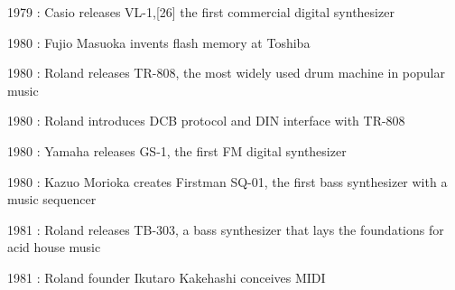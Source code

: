 \documentclass[12pt]{report}
\begin{document}
\begin{adjustwidth}{0.5in}{0.0in}
1979 : Casio releases VL-1,[26] the first commercial digital synthesizer\par

\end{adjustwidth}

\begin{adjustwidth}{0.5in}{0.0in}
1980 : Fujio Masuoka invents flash memory at Toshiba\par

\end{adjustwidth}

\begin{adjustwidth}{0.5in}{0.0in}
1980 : Roland releases TR-808, the most widely used drum machine in popular music\par

\end{adjustwidth}

\begin{adjustwidth}{0.5in}{0.0in}
1980 : Roland introduces DCB protocol and DIN interface with TR-808\par

\end{adjustwidth}

\begin{adjustwidth}{0.5in}{0.0in}
1980 : Yamaha releases GS-1, the first FM digital synthesizer\par

\end{adjustwidth}

\begin{adjustwidth}{0.5in}{0.0in}
1980 : Kazuo Morioka creates Firstman SQ-01, the first bass synthesizer with a music sequencer\par

\end{adjustwidth}

\begin{adjustwidth}{0.5in}{0.0in}
1981 : Roland releases TB-303, a bass synthesizer that lays the foundations for acid house music\par

\end{adjustwidth}

\begin{adjustwidth}{0.5in}{0.0in}
1981 : Roland founder Ikutaro Kakehashi conceives MIDI\par

\end{adjustwidth}
\end{document}
